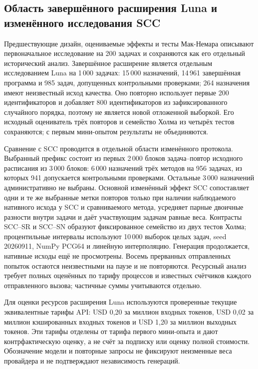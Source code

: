 \subsection{Область завершённого расширения Luna и изменённого исследования SCC}
Предшествующие дизайн, оцениваемые эффекты и тесты Мак-Немара описывают первоначальное исследование на 200 задачах и сохраняются как его отдельный исторический анализ. Завершённое расширение является отдельным исследованием Luna на 1\,000 задачах: 15\,000 назначений, 14\,961 завершённая программа и 985 задач, допущенных контрольными проверками; 264 назначения имеют неизвестный исход качества. Оно повторно использует первые 200 идентификаторов и добавляет 800 идентификаторов из зафиксированного случайного порядка, поэтому не является новой отложенной выборкой. Его исходный оцениватель трёх повторов и семейство Холма из четырёх тестов сохраняются; с первым мини-опытом результаты не объединяются.

Сравнение с SCC проводится в отдельной области изменённого протокола. Выбранный префикс состоит из первых 2\,000 блоков задача--повтор исходного расписания из 3\,000 блоков: 6\,000 назначений трёх методов на 956 задачах, из которых 941 допускается контрольными проверками. Остальные 3\,000 назначений административно не выбраны. Основной изменённый эффект SCC сопоставляет одни и те же выбранные метки повторов только при наличии наблюдаемого нативного исхода у SCC и сравниваемого метода, усредняет парные двоичные разности внутри задачи и даёт участвующим задачам равные веса. Контрасты SCC--SR и SCC--SN образуют фиксированное семейство из двух тестов Холма; процентильные интервалы используют 10\,000 выборок целых задач, seed 20260911, NumPy PCG64 и линейную интерполяцию. Генерация продолжается, нативные исходы ещё не просмотрены. Восемь прерванных отправленных попыток остаются неизвестными на паузе и не повторяются. Ресурсный анализ требует полных оценённых по тарифу процессов и известных счётчиков каждого отправленного вызова; частичные суммы учитываются отдельно.

Для оценки ресурсов расширения Luna используются проверенные текущие эквивалентные тарифы API: USD 0,20 за миллион входных токенов, USD 0,02 за миллион кэшированных входных токенов и USD 1,20 за миллион выходных токенов. Эти тарифы отделены от тарифа первого мини-опыта и дают контрфактическую оценку, а не счёт за подписку или оценку полной стоимости. Обозначение модели и повторные запросы не фиксируют неизменные веса провайдера и не подтверждают независимость генераций.

